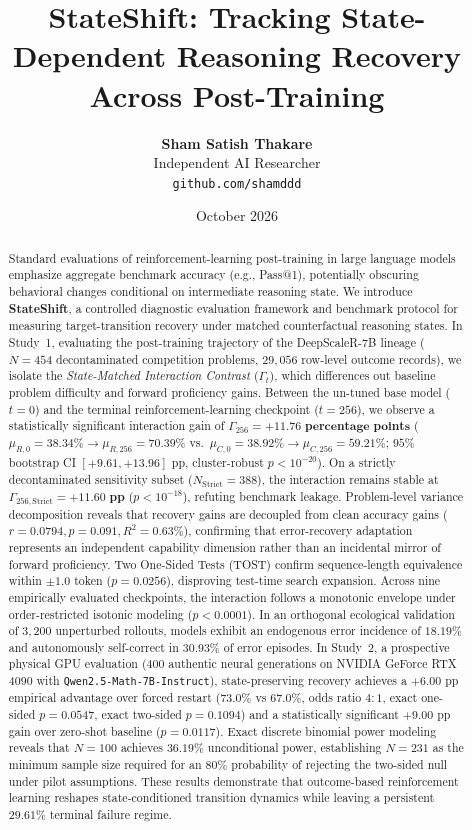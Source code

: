 \documentclass[11pt]{article}
\title{\textbf{StateShift: Tracking State-Dependent Reasoning Recovery\\Across Post-Training}}
\author{
  \textbf{Sham Satish Thakare} \\
  Independent AI Researcher \\
  \texttt{github.com/shamddd} \\
}
\date{October 2026}
\begin{document}
\maketitle

\begin{abstract}
Standard evaluations of reinforcement-learning post-training in large language models emphasize aggregate benchmark accuracy (e.g., Pass@1), potentially obscuring behavioral changes conditional on intermediate reasoning state. We introduce \textbf{StateShift}, a controlled diagnostic evaluation framework and benchmark protocol for measuring target-transition recovery under matched counterfactual reasoning states. In Study~1, evaluating the post-training trajectory of the DeepScaleR-7B lineage ($N=454$ decontaminated competition problems, $29,056$ row-level outcome records), we isolate the \emph{State-Matched Interaction Contrast} ($\Gamma_t$), which differences out baseline problem difficulty and forward proficiency gains. Between the un-tuned base model ($t=0$) and the terminal reinforcement-learning checkpoint ($t=256$), we observe a statistically significant interaction gain of $\Gamma_{256} = \mathbf{+11.76\text{ percentage points}}$ ($\mu_{R,0}=38.34\% \to \mu_{R,256}=70.39\%$ vs.\ $\mu_{C,0}=38.92\% \to \mu_{C,256}=59.21\%$; $95\%$ bootstrap CI $[+9.61, +13.96]\text{ pp}$, cluster-robust $p < 10^{-20}$). On a strictly decontaminated sensitivity subset ($N_{\text{Strict}}=388$), the interaction remains stable at $\Gamma_{256,\text{Strict}} = \mathbf{+11.60\text{ pp}}$ ($p < 10^{-18}$), refuting benchmark leakage. Problem-level variance decomposition reveals that recovery gains are decoupled from clean accuracy gains ($r = 0.0794, p = 0.091, R^2 = 0.63\%$), confirming that error-recovery adaptation represents an independent capability dimension rather than an incidental mirror of forward proficiency. Two One-Sided Tests (TOST) confirm sequence-length equivalence within $\pm 1.0$ token ($p = 0.0256$), disproving test-time search expansion. Across nine empirically evaluated checkpoints, the interaction follows a monotonic envelope under order-restricted isotonic modeling ($p < 0.0001$). In an orthogonal ecological validation of $3,200$ unperturbed rollouts, models exhibit an endogenous error incidence of $18.19\%$ and autonomously self-correct in $30.93\%$ of error episodes. In Study~2, a prospective physical GPU evaluation ($400$ authentic neural generations on NVIDIA GeForce RTX 4090 with \texttt{Qwen2.5-Math-7B-Instruct}), state-preserving recovery achieves a $+6.00\text{ pp}$ empirical advantage over forced restart ($73.0\%$ vs $67.0\%$, odds ratio $4:1$, exact one-sided $p = 0.0547$, exact two-sided $p = 0.1094$) and a statistically significant $+9.00\text{ pp}$ gain over zero-shot baseline ($p = 0.0117$). Exact discrete binomial power modeling reveals that $N=100$ achieves $36.19\%$ unconditional power, establishing $N=231$ as the minimum sample size required for an $80\%$ probability of rejecting the two-sided null under pilot assumptions. These results demonstrate that outcome-based reinforcement learning reshapes state-conditioned transition dynamics while leaving a persistent $29.61\%$ terminal failure regime.
\end{abstract}
\end{document}
